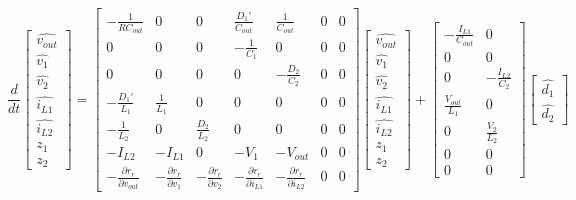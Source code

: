 \documentclass[journal, onecolumn, final, letterpaper, 11pt]{IEEEtran}
\begin{document}
\scriptsize
\begin{equation}
\label{eqn:aug_ss_model}
\frac{d}{dt}
\begin{bmatrix}
	\widehat{v_{out}} \\
	\widehat{v_1} \\
	\widehat{v_2} \\
	\widehat{i_{L1}} \\
	\widehat{i_{L2}} \\
	z_1 \\
	z_2
\end{bmatrix}
=
\begin{bmatrix}
	-\frac{1}{RC_{out}} & 0 & 0 & \frac{D_1'}{C_{out}} & \frac{1}{C_{out}} & 0 & 0 \\
	0 & 0 & 0 & -\frac{1}{C_1} & 0 & 0 & 0 \\
	0 & 0 & 0 & 0 & -\frac{D_2}{C_2} & 0 & 0\\
	-\frac{D_1'}{L_1} & \frac{1}{L_1} & 0 & 0 & 0 & 0 & 0 \\
	-\frac{1}{L_2} & 0 & \frac{D_2}{L_2} & 0 & 0 & 0 & 0 \\
	-I_{L2} & -I_{L1} & 0 & -V_1 & -V_{out} & 0 & 0 \\
	-\frac{\partial r_r}{\partial v_{out}} & -\frac{\partial r_r}{\partial v_{1}} & -\frac{\partial r_r}{\partial v_{2}} & -\frac{\partial r_r}{\partial i_{L1}} & -\frac{\partial r_r}{\partial i_{L2}} & 0 & 0
\end{bmatrix}
\begin{bmatrix}
	\widehat{v_{out}} \\
	\widehat{v_1} \\
	\widehat{v_2} \\
	\widehat{i_{L1}} \\
	\widehat{i_{L2}} \\
	z_1 \\
	z_2
\end{bmatrix}
+
\begin{bmatrix}
	-\frac{I_{L1}}{C_{out}} & 0 \\
	0 & 0 \\
	0 & -\frac{I_{L2}}{C_2} \\
	\frac{V_{out}}{L_1} & 0 \\
	0 & \frac{V_2}{L_2} \\
	0 & 0 \\
	0 & 0
\end{bmatrix}
\begin{bmatrix}
	\widehat{d_1} \\
	\widehat{d_2}
\end{bmatrix}
\end{equation}
\normalsize
\end{document}
